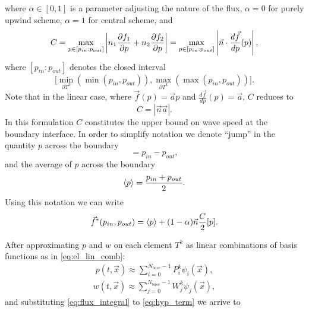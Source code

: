 where $\alpha \in [0, 1]$ is a parameter adjusting the nature of the flux, $\alpha = 0$ for
purely upwind scheme,
$\alpha = 1$ for central scheme,  and
\begin{equation}
C = \max_{p \in [p_{in} : p_{out}]} \left\lvert n_1 \frac{\partial f_1}{\partial p} + n_2 \frac{\partial f_2}{\partial p}\right\rvert =
\max_{p \in [p_{in} : p_{out}]} \left\lvert\vec{n}\cdot\frac{d\vec{f}}{dp}(p)\right\rvert,
\end{equation}
where $[p_{in} : p_{out}]$ denotes the closed interval
$$\big[\min_{\partial{T^k}} (\min(p_{in}, p_{out})),
\max_{\partial{T^k}}(\max(p_{in}, p_{out}))\big].$$
Note that in the linear case, where $\vec{f}(p) = \vec{a}p$ and $\frac{d\vec{f}}{dp}(p) = 
\vec{a}$, $C$ reduces to
\begin{equation}
C = |\vec{n}\vec{a}|.
\end{equation}
In this formulation $C$ constitutes the upper bound on wave speed at the boundary interface.
In order to simplify notation we denote ``jump'' in
the quantity $p$ across the boundary
\begin{equation}
[p] = p_{in} - p_{out},
\end{equation}
and the average of $p$ across the boundary
\begin{equation}
\label{eq:avrg}
\langle p\rangle = \frac{p_{in}+p_{out}}{2}.
\end{equation}
Using this notation we can write
\begin{equation}
\vec{f}^*(p_{in}, p_{out}) = \langle p\rangle + (1-\alpha) \vec{n}\frac{C}{2}[p].
\end{equation}

After approximating $p$ and $w$ on each element $T^k$ as linear combinations of
basis functions as in \eqref{eq:el_lin_comb}:
\begin{align}
\label{eq:state_epprox}
p(t, \vec{x}) \approx \sum\limits_{i=0}^{N_{base}-1} P_i^k\psi_i(\vec{x}),
\end{align}
\begin{align}
\label{eq:test_approx}
w(t, \vec{x}) \approx \sum\limits_{j=0}^{N_{base}-1} W_j^k\psi_j(\vec{x}),
\end{align}
and substituting \eqref{eq:flux_integral} to \eqref{eq:hyp_term} we arrive to

